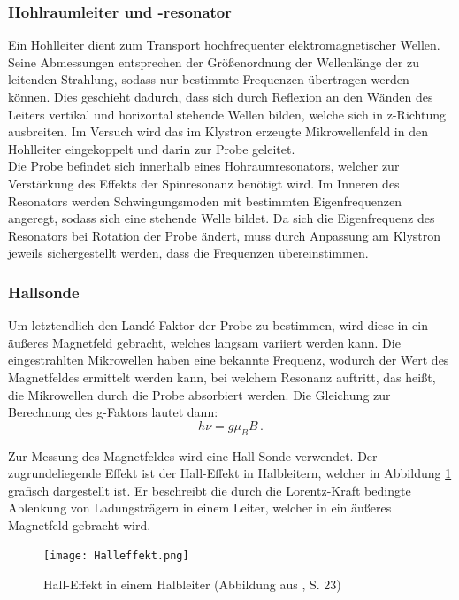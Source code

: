 \documentclass{scrartcl}
\begin{document}
\subsubsection{Hohlraumleiter und -resonator}
Ein Hohlleiter dient zum Transport hochfrequenter elektromagnetischer Wellen. Seine Abmessungen entsprechen der Größenordnung der Wellenlänge der zu leitenden Strahlung, sodass nur bestimmte Frequenzen übertragen werden können. Dies geschieht dadurch, dass sich durch Reflexion an den Wänden des Leiters vertikal und horizontal stehende Wellen bilden, welche sich in z-Richtung ausbreiten. Im Versuch wird das im Klystron erzeugte Mikrowellenfeld in den Hohlleiter eingekoppelt und darin zur Probe geleitet. \\

Die Probe befindet sich innerhalb eines Hohraumresonators, welcher zur Verstärkung des Effekts der Spinresonanz benötigt wird. Im Inneren des Resonators werden Schwingungsmoden mit bestimmten Eigenfrequenzen angeregt, sodass sich eine stehende Welle bildet. Da sich die Eigenfrequenz des Resonators bei Rotation der Probe ändert, muss durch Anpassung am Klystron jeweils sichergestellt werden, dass die Frequenzen übereinstimmen.

\subsubsection{Hallsonde}

Um letztendlich den Landé-Faktor der Probe zu bestimmen, wird diese in ein äußeres Magnetfeld gebracht, welches langsam variiert werden kann. Die eingestrahlten Mikrowellen haben eine bekannte Frequenz, wodurch der Wert des Magnetfeldes ermittelt werden kann, bei welchem Resonanz auftritt, das heißt, die Mikrowellen durch die Probe absorbiert werden. Die Gleichung zur Berechnung des g-Faktors lautet dann:
\begin{equation}
    h \nu = g \mu_B B \, .
\end{equation} 

Zur Messung des Magnetfeldes wird eine Hall-Sonde verwendet. Der zugrundeliegende Effekt ist der Hall-Effekt in Halbleitern, welcher in Abbildung \ref{fig:Halleffekt} grafisch dargestellt ist. Er beschreibt die durch die Lorentz-Kraft bedingte Ablenkung von Ladungsträgern in einem Leiter, welcher in ein äußeres Magnetfeld gebracht wird. 

\begin{figure}[h!]
    \centering
    \texttt{[image: Halleffekt.png]}
    \caption{Hall-Effekt in einem Halbleiter (Abbildung aus \cite{Grundlagen}, S. 23)}
    \label{fig:Halleffekt}
\end{figure}
\end{document}

